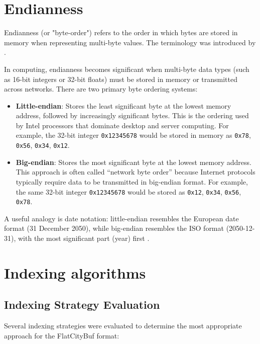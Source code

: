 \section{Endianness}
\label{tb:endianness}
Endianness (or "byte-order") refers to the order in which bytes are stored in memory when representing multi-byte values. The terminology was introduced by \citet{danny_cohen_1981}.

In computing, endianness becomes significant when multi-byte data types (such as 16-bit integers or 32-bit floats) must be stored in memory or transmitted across networks. There are two primary byte ordering systems:

\begin{itemize}
  \item \textbf{Little-endian}: Stores the least significant byte at the lowest memory address, followed by increasingly significant bytes. This is the ordering used by Intel processors that dominate desktop and server computing. For example, the 32-bit integer \texttt{0x12345678} would be stored in memory as \texttt{0x78}, \texttt{0x56}, \texttt{0x34}, \texttt{0x12}.

  \item \textbf{Big-endian}: Stores the most significant byte at the lowest memory address. This approach is often called ``network byte order'' because Internet protocols typically require data to be transmitted in big-endian format. For example, the same 32-bit integer \texttt{0x12345678} would be stored as \texttt{0x12}, \texttt{0x34}, \texttt{0x56}, \texttt{0x78}.
\end{itemize}

A useful analogy is date notation: little-endian resembles the European date format (31 December 2050), while big-endian resembles the ISO format (2050-12-31), with the most significant part (year) first \citep{endianness_mdn}.


\section{Indexing algorithms}
\label{tb:indexing_algorithms}

\subsection{Indexing Strategy Evaluation}

Several indexing strategies were evaluated to determine the most appropriate approach for the FlatCityBuf format:

